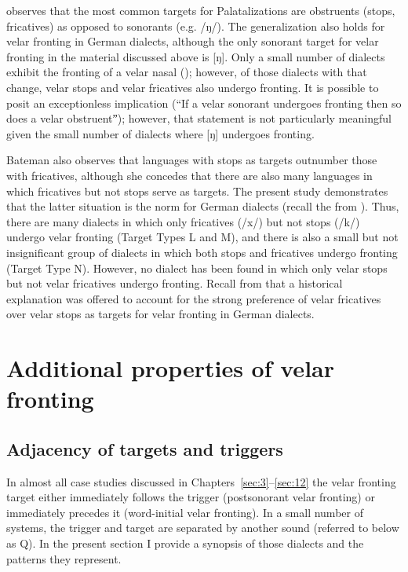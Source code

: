 \textcite[56ff.]{Bateman2007} observes that the most common targets for Palatalizations are obstruents (stops, fricatives) as opposed to sonorants (e.g. /ŋ/). The generalization also holds for velar fronting in German dialects, although the only sonorant target for velar fronting in the material discussed above is [ŋ]. Only a small number of dialects exhibit the fronting of a velar nasal (); however, of those dialects with that change, velar stops and velar fricatives also undergo fronting. It is possible to posit an exceptionless implication (“If a velar sonorant undergoes fronting then so does a velar obstruentˮ); however, that statement is not particularly meaningful given the small number of dialects where [ŋ] undergoes fronting.

Bateman also observes that languages with stops as targets outnumber those with fricatives, although she concedes that there are also many languages in which fricatives but not stops serve as targets. The present study demonstrates that the latter situation is the norm for German dialects (recall the  from ). Thus, there are many dialects in which only fricatives (/x/) but not stops (/k/) undergo velar fronting (Target Types L and M), and there is also a small but not insignificant group of dialects in which both stops and fricatives undergo fronting (Target Type N). However, no dialect has been found in which only velar stops but not velar fricatives undergo fronting. Recall from  that a historical explanation was offered to account for the strong preference of velar fricatives over velar stops as targets for velar fronting in German dialects.

\section{Additional properties of velar fronting}\label{sec:12.8}\largerpage

\subsection{Adjacency of targets and triggers}\label{sec:12.8.1}

In almost all case studies discussed in Chapters~\ref{sec:3}--\ref{sec:12} the velar fronting target either immediately follows the trigger (postsonorant velar fronting) or immediately precedes it (word-initial velar fronting). In a small number of systems, the trigger and target are separated by another sound (referred to below as Q). In the present section I provide a synopsis of those dialects and the patterns they represent.


